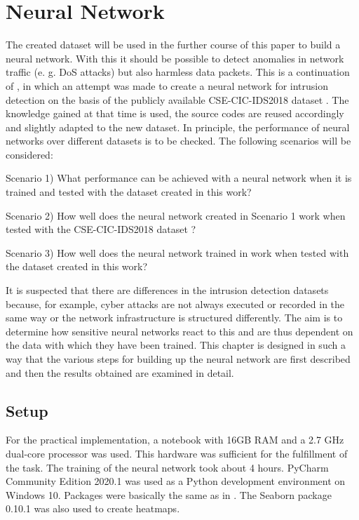 \documentclass[conference]{IEEEtran}
\begin{document}
\section{Neural Network}\label{nn}
The created dataset will be used in the further course of this paper to build a neural network. With this it should be possible to detect anomalies in network traffic (e. g. DoS attacks) but also harmless data packets. This is a continuation of  \cite{max1}, in which an attempt was made to create a neural network for intrusion detection on the basis of the publicly available CSE-CIC-IDS2018 dataset  \cite{max2}. The knowledge gained at that time is used, the source codes are reused accordingly and slightly adapted to the new dataset. In principle, the performance of neural networks over different datasets is to be checked. The following scenarios will be considered:
\smallskip

Scenario 1) What performance can be achieved with a neural network when it is trained and tested with the dataset created in this work? 
\smallskip

Scenario 2) How well does the neural network created in Scenario 1 work when tested with the CSE-CIC-IDS2018 dataset  \cite{max2}? 
\smallskip

Scenario 3) How well does the neural network trained in \cite{max1} work when tested with the dataset created in this work?
\smallskip

It is suspected that there are differences in the intrusion detection datasets because, for example, cyber attacks are not always executed or recorded in the same way or the network infrastructure is structured differently. The aim is to determine how sensitive neural networks react to this and are thus dependent on the data with which they have been trained. This chapter is designed in such a way that the various steps for building up the neural network are first described and then the results obtained are examined in detail.

\subsection{Setup}
For the practical implementation, a notebook with 16GB RAM and a 2.7 GHz dual-core processor was used. This hardware was sufficient for the fulfillment of the task. The training of the neural network took about 4 hours. PyCharm Community Edition 2020.1 was used as a Python development environment on Windows 10. Packages were basically the same as in \cite{max1}. The Seaborn package 0.10.1 was also used to create heatmaps.
\end{document}
